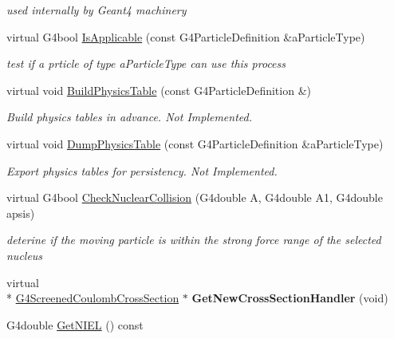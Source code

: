 \begin{DoxyCompactItemize}
\begin{DoxyCompactList}\small\item\em used internally by Geant4 machinery \end{DoxyCompactList}\item 
virtual G4bool \hyperlink{classG4ScreenedNuclearRecoil_a3f764c88f7a12951ff16b184081f7fd9}{Is\-Applicable} (const G4\-Particle\-Definition \&a\-Particle\-Type)
\begin{DoxyCompactList}\small\item\em test if a prticle of type {\itshape a\-Particle\-Type} can use this process \end{DoxyCompactList}\item 
virtual void \hyperlink{classG4ScreenedNuclearRecoil_a8862a7af081d952a63839157d7c653d2}{Build\-Physics\-Table} (const G4\-Particle\-Definition \&)
\begin{DoxyCompactList}\small\item\em Build physics tables in advance. Not Implemented. \end{DoxyCompactList}\item 
virtual void \hyperlink{classG4ScreenedNuclearRecoil_a29563bde39caea67caadd4e60d9f736d}{Dump\-Physics\-Table} (const G4\-Particle\-Definition \&a\-Particle\-Type)
\begin{DoxyCompactList}\small\item\em Export physics tables for persistency. Not Implemented. \end{DoxyCompactList}\item 
virtual G4bool \hyperlink{classG4ScreenedNuclearRecoil_aa22d29f8744e5c8f55935f6d1bd88478}{Check\-Nuclear\-Collision} (G4double A, G4double A1, G4double apsis)
\begin{DoxyCompactList}\small\item\em deterine if the moving particle is within the strong force range of the selected nucleus \end{DoxyCompactList}\item 
\hypertarget{classG4ScreenedNuclearRecoil_a97e43210067375ffcdc61742b57e4d47}{virtual \\*
\hyperlink{classG4ScreenedCoulombCrossSection}{G4\-Screened\-Coulomb\-Cross\-Section} $\ast$ {\bfseries Get\-New\-Cross\-Section\-Handler} (void)}\label{classG4ScreenedNuclearRecoil_a97e43210067375ffcdc61742b57e4d47}

\item 
\hypertarget{classG4ScreenedNuclearRecoil_ae05a88f90d98f618a236e7a5c9b3a460}{G4double \hyperlink{classG4ScreenedNuclearRecoil_ae05a88f90d98f618a236e7a5c9b3a460}{Get\-N\-I\-E\-L} () const }\label{classG4ScreenedNuclearRecoil_ae05a88f90d98f618a236e7a5c9b3a460}


\end{DoxyCompactItemize}

